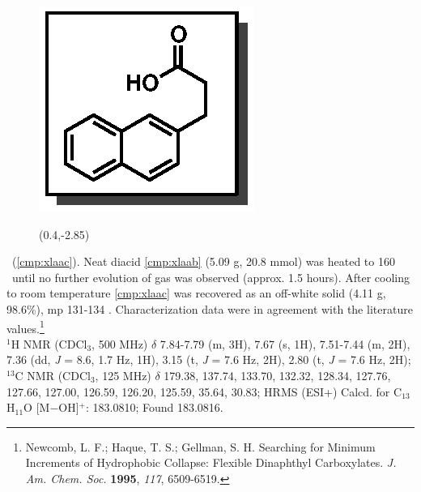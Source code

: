 \vspace{10pt}
\begin{figure}
  \vspace{-22pt}
  \begin{center}
    \includegraphics[scale=0.8]{chp_asymmetric/images/xlaac}
           \begin{textblock}{1}(0.4,-2.85)  \end{textblock}
  \end{center}
  \vspace{-25pt}
\end{figure}
\noindent \textbf{\CMPxlaac}\ (\ref{cmp:xlaac}). Neat diacid \ref{cmp:xlaab}
(5.09 g, 20.8 mmol) was heated to 160 \degc\ until no further evolution of gas was
observed (approx. 1.5 hours). After cooling to room temperature \ref{cmp:xlaac}
was recovered as an off-white solid (4.11 g, 98.6\%), mp 131-134 \degc. Characterization data were in agreement with the literature
values.\footnote{{\frenchspacing Newcomb, L. F.; Haque, T. S.; Gellman, S. H. Searching for Minimum
Increments of Hydrophobic Collapse: Flexible Dinaphthyl Carboxylates. \textit{J. Am. Chem. Soc.}
\textbf{1995}, \textit{117}, 6509-6519.}} \\
$^1$H NMR (CDCl$_3$, 500 MHz) $\delta$ 7.84-7.79 (m, 3H), 7.67 (s, 1H),
7.51-7.44 (m, 2H), 7.36 (dd, \textit{J} = 8.6, 1.7 Hz, 1H), 3.15 (t, \textit{J}
= 7.6 Hz, 2H), 2.80 (t, \textit{J} = 7.6 Hz, 2H); $^{13}$C NMR (CDCl$_3$, 125
MHz) $\delta$ 179.38, 137.74, 133.70, 132.32, 128.34, 127.76, 127.66, 127.00, 126.59, 126.20, 125.59, 35.64, 30.83; HRMS (ESI+) Calcd. for C$_{13}$H$_{11}$O [M$-$OH]$^+$: 183.0810; Found 183.0816.


